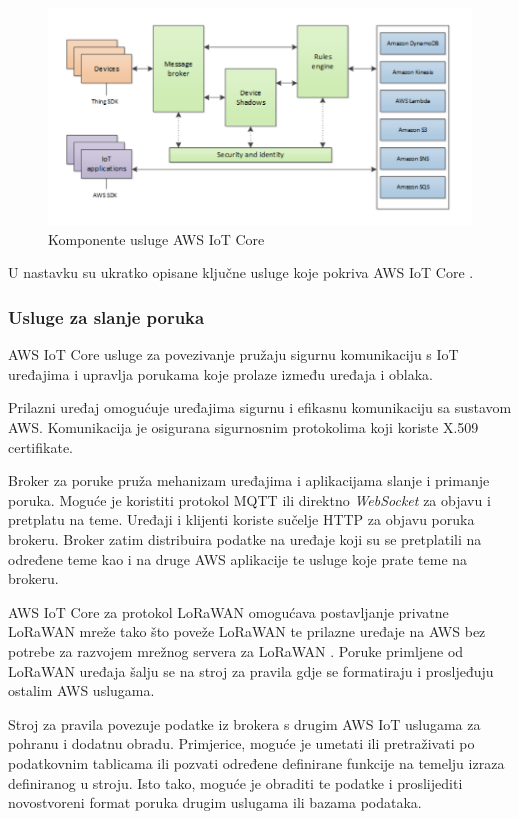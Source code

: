 \begin{figure}[ht]
	\centering
	\includegraphics[scale=0.6]{imgs/aws_iot_core_components}
	\caption{Komponente usluge AWS IoT Core \cite{aws_docs}}
	\label{fig:aws_iot_core_components}
\end{figure}

U nastavku su ukratko opisane ključne usluge koje pokriva AWS IoT Core \cite{aws_docs}.

\subsubsection{Usluge za slanje poruka}

AWS IoT Core usluge za povezivanje pružaju sigurnu komunikaciju s IoT uređajima i upravlja porukama koje prolaze između uređaja i oblaka.

Prilazni uređaj omogućuje uređajima sigurnu i efikasnu komunikaciju sa sustavom AWS. Komunikacija je osigurana sigurnosnim protokolima koji koriste  X.509 certifikate. 

Broker za poruke pruža mehanizam uređajima i aplikacijama slanje i primanje poruka. Moguće je koristiti protokol MQTT ili direktno \textit{WebSocket} za objavu i pretplatu na teme. Uređaji i klijenti koriste sučelje HTTP  za objavu poruka brokeru. Broker zatim distribuira podatke na uređaje koji su se pretplatili na određene teme kao i na druge AWS aplikacije te usluge koje prate teme na brokeru.

AWS IoT Core za protokol LoRaWAN omogućava postavljanje privatne LoRaWAN mreže tako što poveže LoRaWAN te prilazne uređaje na AWS bez potrebe za razvojem mrežnog servera za LoRaWAN . Poruke primljene od LoRaWAN uređaja šalju se na stroj za pravila  gdje se formatiraju i prosljeđuju ostalim AWS uslugama.

Stroj za pravila  povezuje podatke iz brokera s drugim AWS IoT uslugama za pohranu i dodatnu obradu. Primjerice, moguće je umetati ili pretraživati po podatkovnim tablicama ili pozvati određene definirane funkcije na temelju izraza definiranog u stroju. Isto tako, moguće je obraditi te podatke i proslijediti novostvoreni format poruka drugim uslugama ili bazama podataka.

